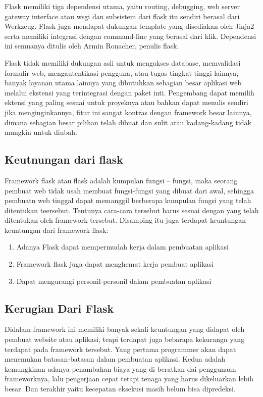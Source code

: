 Flask memiliki tiga dependensi utama, yaitu routing, debugging, web server gateway interface atau wsgi dan subsistem dari flask itu 
sendiri berasal dari Werkzeug. Flask juga mendapat dukungan template yang disediakan oleh Jinja2 serta memiliki integrasi dengan  
command-line yang berasal dari klik. Dependensi ini semuanya ditulis oleh Armin Ronacher, penulis flask.

Flask tidak memiliki dukungan asli untuk mengakses database, memvalidasi formulir web, mengautentikasi pengguna, atau tugas tingkat 
tinggi lainnya, banyak layanan utama lainnya yang dibutuhkan sebagian besar aplikasi web melalui ekstensi yang terintegrasi dengan paket 
inti. Pengembang dapat memilih ektensi yang paling sesuai untuk proyeknya atau bahkan dapat menulis sendiri jika menginginkannya, fitur 
ini sangat kontras dengan framework besar lainnya, dimana sebagian besar pilihan telah dibuat dan sulit atau kadang-kadang tidak mungkin 
untuk diubah. 

\subsection{Keutnungan dari flask}
Framework flask atau flask adalah kumpulan fungsi – fungsi, maka seorang pembuat web tidak usah membuat fungsi-fungsi yang dibuat dari 
awal, sehingga pembuatn web tinggal dapat memanggil berberapa kumpulan fungsi yang telah ditentukan teersebut. Tentunya cara-cara 
tersebut harus sesuai dengan yang telah ditentukan oleh framework tersebut. Disamping itu juga terdapat keuntungan-keuntungan dari 
framework flask:
\begin{enumerate}
\item Adanya Flask dapat mempermudah kerja dalam pembuatan aplikasi
\item Framework flask juga dapat menghemat kerja pembuat aplikasi
\item Dapat mengurangi personil-personil dalam pembuatan aplikasi
\end{enumerate}

\subsection{Kerugian Dari Flask}
Didalam framework ini memiliki banyak sekali keuntungan yang didapat oleh pembuat website atau aplikasi, teapi terdapat juga bebarapa 
kekurangn yang terdapat pada framework tersebut. Yang pertama programmer akan dapat menemukan batasan-batasan dalam pembuatan aplikasi. 
Kedua adalah kemungkinan adanya penambahan biaya yang di beratkan dai penggunaan frameworknya, lalu  pengerjaan cepat tetapi tenaga yang 
harus dikeluarkan lebih besar. Dan terakhir yaitu kecepatan eksekusi masih belum bisa dipredeksi.

